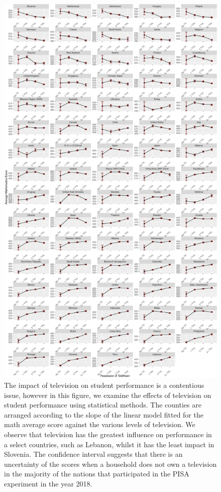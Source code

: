 \begin{Schunk}
\begin{figure}[H]
\includegraphics[width=1\linewidth]{learningtower_files/figure-latex/tv-plot-1} \caption[The impact of television on student performance is a contentious issue, however in this figure, we examine the effects of television on student performance using statistical methods]{The impact of television on student performance is a contentious issue, however in this figure, we examine the effects of television on student performance using statistical methods. The counties are arranged according to the slope of the linear model fitted for the math average score against the various levels of television. We observe that television has the greatest influence on performance in a select countries, such as Lebanon, whilst it has the least impact in Slovenia. The confidence interval suggests that there is an uncertainty of the scores when a household does not own a television in the majority of the nations that participated in the PISA experiment in the year 2018.}\label{fig:tv-plot}
\end{figure}
\end{Schunk}

